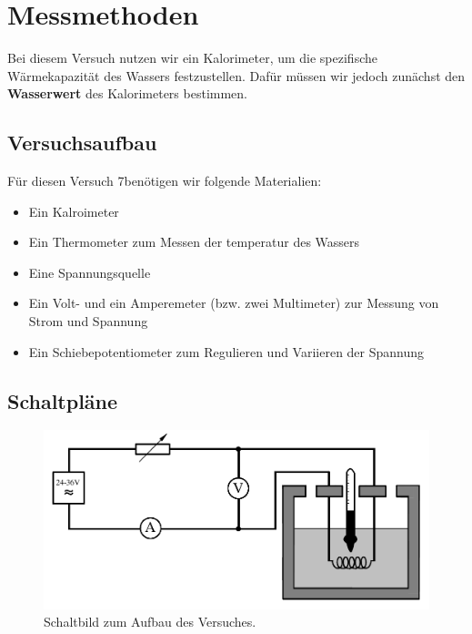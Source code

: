 \documentclass[10pt,a4paper]{article}
\newcommand{\vnr}{7}
\begin{document}
\section{Messmethoden}
\begin{flushleft}
Bei diesem Versuch nutzen wir ein Kalorimeter, um die spezifische Wärmekapazität des Wassers festzustellen. Dafür müssen wir jedoch zunächst den \textbf{Wasserwert} des Kalorimeters bestimmen.
\end{flushleft}

\subsection{Versuchsaufbau}
\begin{flushleft}
Für diesen Versuch \vnr benötigen wir folgende Materialien:
\begin{itemize}[itemsep=0.1pt]
\item Ein Kalroimeter
\item Ein Thermometer zum Messen der temperatur des Wassers
\item Eine Spannungsquelle
\item Ein Volt- und ein Amperemeter (bzw. zwei Multimeter) zur Messung von Strom und Spannung
\item Ein Schiebepotentiometer zum Regulieren und Variieren der Spannung
\end{itemize}
\end{flushleft}

\subsection{Schaltpläne}
\begin{figure}[h]
\centering
\includegraphics[scale=0.4]{Schaltbild_Wkapa}
\caption{Schaltbild zum Aufbau des Versuches.}
\label{fig:schalt}
\end{figure}
\end{document}
